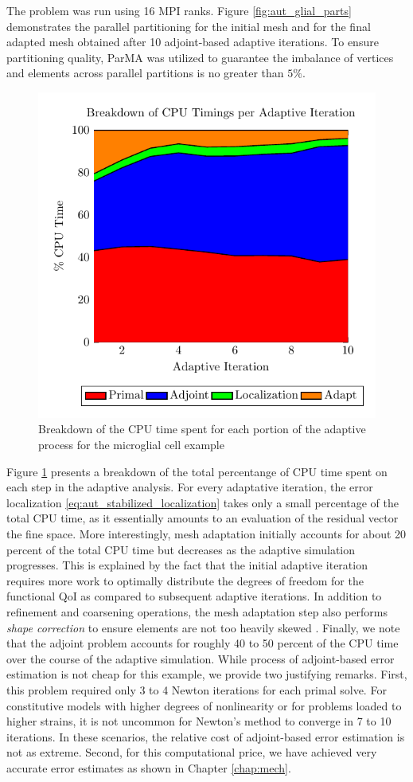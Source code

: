 The problem was run using 16 MPI ranks. Figure \ref{fig:aut_glial_parts}
demonstrates the parallel partitioning for the initial mesh and for
the final adapted mesh obtained after 10 adjoint-based adaptive
iterations. To ensure partitioning quality, ParMA was
utilized to guarantee the imbalance of vertices and elements
across parallel partitions is no greater than $5\%$.

\begin{figure}[ht!]
\centering
\includegraphics[width=0.4\linewidth]{img/aut_glial_timings.pdf}
\caption{Breakdown of the CPU time spent for each portion of
the adaptive process for the microglial cell example}
\label{fig:aut_glial_timings}
\end{figure}

Figure \ref{fig:aut_glial_timings} presents a breakdown of the
total percentange of CPU time spent on each step in the
adaptive analysis. For every adaptative iteration, the error
localization \eqref{eq:aut_stabilized_localization} takes only
a small percentage of the total CPU time, as it essentially amounts
to an evaluation of the residual vector the fine space. More
interestingly, mesh adaptation initially accounts for about
20 percent of the total CPU time but decreases as the adaptive
simulation progresses. This is explained by the fact that the initial
adaptive iteration requires more work to optimally distribute
the degrees of freedom for the functional QoI as compared to
subsequent adaptive iterations. In addition to refinement
and coarsening operations, the mesh adaptation step also
performs \emph{shape correction} to ensure elements are not
too heavily skewed \cite{li20053d}. Finally, we note that the
adjoint problem accounts for roughly 40 to 50 percent of the CPU time
over the course of the adaptive simulation. While process of
adjoint-based error estimation is not cheap for this example,
we provide two justifying remarks. First, this problem required only
3 to 4 Newton iterations for each primal solve. For constitutive
models with higher degrees of nonlinearity or for problems loaded to
higher strains, it is not uncommon for Newton's method to converge
in 7 to 10 iterations. In these scenarios, the relative cost of
adjoint-based error estimation is not as extreme.
Second, for this computational price, we have
achieved very accurate error estimates as shown in
Chapter \ref{chap:mech}.

